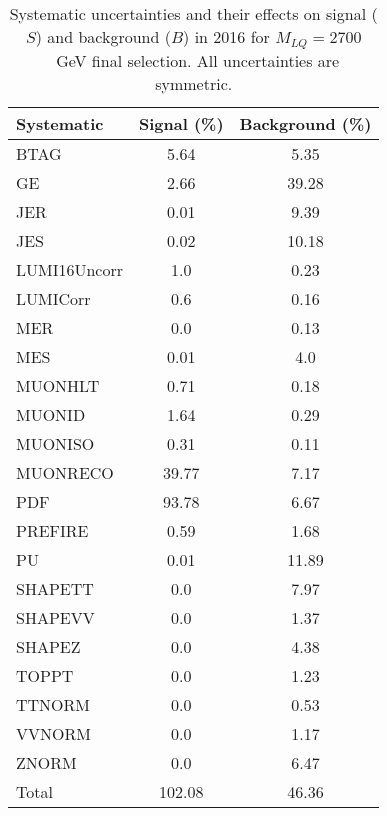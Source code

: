 \begin{table}[htbp]
\begin{center}
\caption{Systematic uncertainties and their effects on signal ($S$) and background ($B$) in 2016 for $M_{LQ}=2700$~GeV final selection. All uncertainties are symmetric.}
\begin{tabular}{lcc}
\hline\hline
Systematic & Signal (\%) & Background (\%) \\ \hline 
BTAG & 5.64 & 5.35\\ 
GE & 2.66 & 39.28\\ 
JER & 0.01 & 9.39\\ 
JES & 0.02 & 10.18\\ 
LUMI16Uncorr & 1.0 & 0.23\\ 
LUMICorr & 0.6 & 0.16\\ 
MER & 0.0 & 0.13\\ 
MES & 0.01 & 4.0\\ 
MUONHLT & 0.71 & 0.18\\ 
MUONID & 1.64 & 0.29\\ 
MUONISO & 0.31 & 0.11\\ 
MUONRECO & 39.77 & 7.17\\ 
PDF & 93.78 & 6.67\\ 
PREFIRE & 0.59 & 1.68\\ 
PU & 0.01 & 11.89\\ 
SHAPETT & 0.0 & 7.97\\ 
SHAPEVV & 0.0 & 1.37\\ 
SHAPEZ & 0.0 & 4.38\\ 
TOPPT & 0.0 & 1.23\\ 
TTNORM & 0.0 & 0.53\\ 
VVNORM & 0.0 & 1.17\\ 
ZNORM & 0.0 & 6.47\\ 
Total & 102.08 & 46.36\\ \hline \hline
\end{tabular}
\label{tab:SysUncertainties_uujj_2700}
\end{center}
\end{table}

